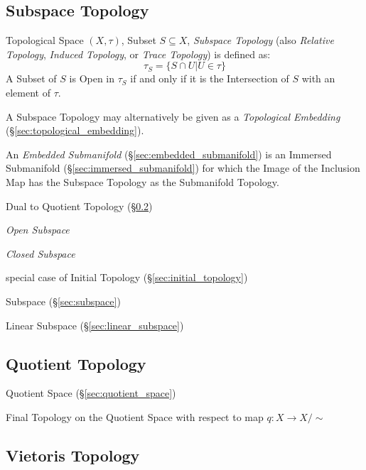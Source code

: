 \subsection{Subspace Topology}\label{sec:subspace_topology}

Topological Space $(X,\tau)$, Subset $S \subseteq X$, \emph{Subspace
  Topology} (also \emph{Relative Topology}, \emph{Induced Topology},
or \emph{Trace Topology}) is defined as:
\[
  \tau_S = \{ S \cap U | U \in \tau \}
\]
A Subset of $S$ is Open in $\tau_S$ if and only if it is the
Intersection of $S$ with an element of $\tau$.

A Subspace Topology may alternatively be given as a \emph{Topological
  Embedding} (\S\ref{sec:topological_embedding}).

An \emph{Embedded Submanifold} (\S\ref{sec:embedded_submanifold}) is an
Immersed Submanifold (\S\ref{sec:immersed_submanifold}) for which the Image of
the Inclusion Map has the Subspace Topology as the Submanifold Topology.

Dual to Quotient Topology (\S\ref{sec:quotient_topology})

\emph{Open Subspace}

\emph{Closed Subspace}

special case of Initial Topology (\S\ref{sec:initial_topology})

\fist Subspace (\S\ref{sec:subspace})

\fist Linear Subspace (\S\ref{sec:linear_subspace})



\subsection{Quotient Topology}\label{sec:quotient_topology}

Quotient Space (\S\ref{sec:quotient_space})

Final Topology on the Quotient Space with respect to map $q : X
\rightarrow X / \sim$



\subsection{Vietoris Topology}\label{sec:vietoris_topology}

